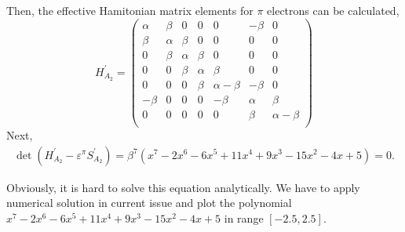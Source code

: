 \documentclass[a4paper]{book}
\newcommand{\Hp}{H^\prime}
\newcommand{\Sp}{S^\prime}
\begin{document}
\begin{solution}
\begin{enumerate}[label=(\alph*)]
		Then, the effective Hamitonian matrix elements for $\pi$ electrons can be calculated,
		\begin{equation*}
			\Hp_{A_2} = \begin{pmatrix}
\alpha&\beta&	0	&	0	&		0	&	-\beta 	&	0	\\
\beta&\alpha&\beta	&	0	&		0	&	0	&	0	\\
0	&\beta	&\alpha	&\beta	&		0	&	0	&	0	\\
0	&	0	&\beta	&\alpha	&	\beta	&	0	&	0	\\
0	&	0	&	0	&\beta	&\alpha-\beta&	-\beta	&	0\\
-\beta&	0	&	0	&	0	& -\beta	&	\alpha	&	\beta \\
0	&	0	&	0	&	0	&	0		&	\beta	&\alpha-\beta\\
			\end{pmatrix}					
		\end{equation*}
		Next,
		\begin{align*}
			\det(\Hp_{A_2}-\varepsilon^\pi \Sp_{A_2}) = \beta^7 ( x^7 - 2x^6 - 6x^5 + 11x^4 + 9x^3 -15x^2 -4x +5 ) = 0.
		\end{align*}
		
		Obviously, it is hard to solve this equation analytically. We have to apply numerical solution in current issue and plot the polynomial $x^7 - 2x^6 - 6x^5 + 11x^4 + 9x^3 -15x^2 -4x +5$ in range $[-2.5, 2.5]$.
		

\end{enumerate}
\end{solution}
\end{document}

